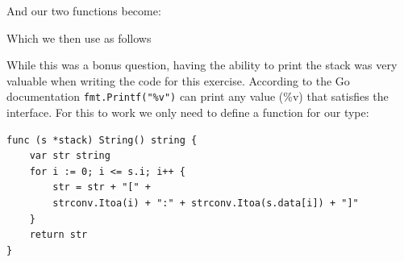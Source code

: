 \begin{Answer}
\noindent{}And our two functions become:

Which we then use as follows


\Question While this was a bonus question, having the ability to print
the stack was very valuable when writing the code for this exercise.
According to the Go documentation \lstinline{fmt.Printf("%v")} can
print any value (\%v) that satisfies the  interface.
For this to work we only need to define a  function for
our type:
\begin{lstlisting}
func (s *stack) String() string {
	var str string
	for i := 0; i <= s.i; i++ {
		str = str + "[" +
		strconv.Itoa(i) + ":" + strconv.Itoa(s.data[i]) + "]"
	}
	return str
}
\end{lstlisting}
\end{Answer}
